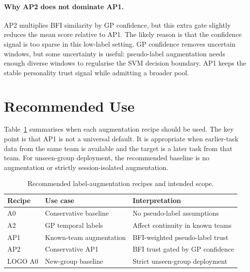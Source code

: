 \documentclass[sigconf,review,anonymous]{acmart}
\begin{document}
\paragraph{Why AP2 does not dominate AP1.}
AP2 multiplies BFI similarity by GP confidence, but this extra gate slightly
reduces the mean score relative to AP1.
The likely reason is that the confidence signal is too sparse in this
low-label setting.
GP confidence removes uncertain windows, but some uncertainty is useful:
pseudo-label augmentation needs enough diverse windows to regularise the SVM
decision boundary.
AP1 keeps the stable personality trust signal while admitting a broader pool.

\section{Recommended Use}
\label{sec:recommended}

Table~\ref{tab:recipes} summarises when each augmentation recipe should be
used.
The key point is that AP1 is not a universal default.
It is appropriate when earlier-task data from the same team is available and
the target is a later task from that team.
For unseen-group deployment, the recommended baseline is no augmentation or
strictly session-isolated augmentation.

\begin{table}[t]
\caption{Recommended label-augmentation recipes and intended scope.}
\label{tab:recipes}
\centering
\setlength{\tabcolsep}{3pt}
\small
\begin{tabular}{>{\raggedright\arraybackslash}p{}>{\raggedright\arraybackslash}p{}>{\raggedright\arraybackslash}p{}}
\toprule
\textbf{Recipe} & \textbf{Use case} & \textbf{Interpretation} \\
\midrule
A0 & Conservative baseline & No pseudo-label assumptions \\
A2 & GP temporal labels & Affect continuity in known teams \\
AP1 & Known-team augmentation & BFI-weighted pseudo-label trust \\
AP2 & Conservative AP1 & BFI trust gated by GP confidence \\
LOGO A0 & New-group baseline & Strict unseen-group deployment \\
\bottomrule
\end{tabular}
\end{table}
\end{document}
